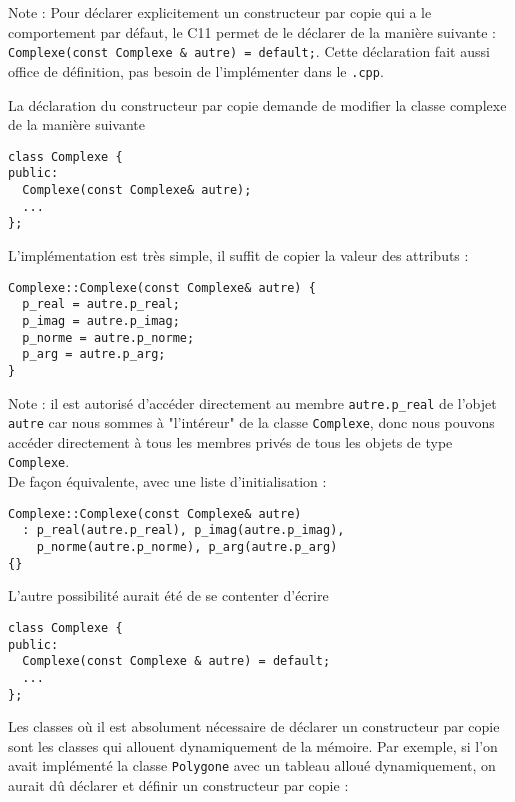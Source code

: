 \documentclass{book}
\newcommand{\inline}[1]{\texttt{#1}}
\newcommand{\cpp}{\mbox{C\vspace{.5em}\protect\raisebox{.2ex}{\footnotesize++~}}}
\begin{document}

Note : Pour déclarer explicitement un constructeur par copie qui a le comportement par défaut, le \cpp11 permet de le déclarer de la manière suivante : \inline{Complexe(const Complexe & autre) = default;}. Cette déclaration fait aussi office de définition, pas besoin de l'implémenter dans le \texttt{.cpp}.

\begin{correction}
La déclaration du constructeur par copie demande de modifier la classe complexe de la manière suivante
\begin{verbatim}
class Complexe {
public:
  Complexe(const Complexe& autre);
  ...
};
\end{verbatim}

L'implémentation est très simple, il suffit de copier la valeur des attributs :
\begin{verbatim}
Complexe::Complexe(const Complexe& autre) {
  p_real = autre.p_real;
  p_imag = autre.p_imag;
  p_norme = autre.p_norme;
  p_arg = autre.p_arg;
}
\end{verbatim}
Note : il est autorisé d'accéder directement au membre \inline{autre.p_real} de l'objet \inline{autre} car nous sommes à "l'intéreur" de la classe \inline{Complexe}, donc nous pouvons accéder directement à tous les membres privés de tous les objets de type \inline{Complexe}.\\

De façon équivalente, avec une liste d'initialisation :
\begin{verbatim}
Complexe::Complexe(const Complexe& autre) 
  : p_real(autre.p_real), p_imag(autre.p_imag),
    p_norme(autre.p_norme), p_arg(autre.p_arg)
{}
\end{verbatim}

L'autre possibilité aurait été de se contenter d'écrire
\begin{verbatim}
class Complexe {
public:
  Complexe(const Complexe & autre) = default;
  ...
};
\end{verbatim}

Les classes où il est absolument nécessaire de déclarer un constructeur par copie sont les classes qui allouent dynamiquement de la mémoire. Par exemple, si l'on avait implémenté la classe \inline{Polygone} avec un tableau alloué dynamiquement, on aurait dû déclarer et définir un constructeur par copie :


\end{correction}
\end{document}
